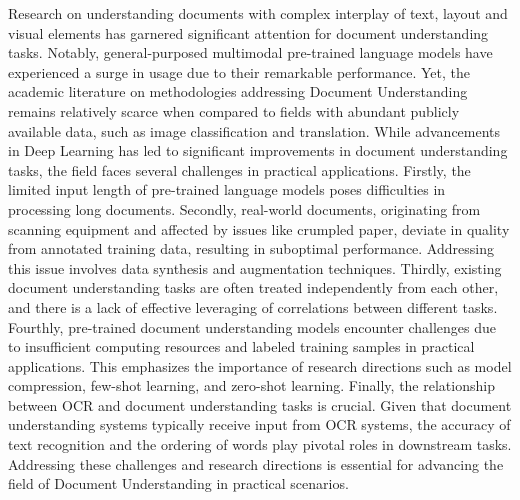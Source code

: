 Research on understanding documents with complex interplay of text, layout and visual elements has garnered significant attention for document understanding tasks. Notably, general-purposed multimodal pre-trained language models have  experienced a surge in usage due to their remarkable performance. Yet, the academic literature on methodologies addressing Document Understanding remains relatively scarce when compared to fields with abundant publicly available data, such as image classification and translation. While advancements in Deep Learning has led to significant improvements in document understanding tasks, the field faces several challenges in practical applications. Firstly, the limited input length of pre-trained language models poses difficulties in processing long documents. Secondly, real-world documents, originating from scanning equipment and affected by issues like crumpled paper, deviate in quality from annotated training data, resulting in suboptimal performance. Addressing this issue involves data synthesis and augmentation techniques. Thirdly, existing document understanding tasks are often treated independently from each other, and there is a lack of effective leveraging of correlations between different tasks. Fourthly, pre-trained document understanding models encounter challenges due to insufficient computing resources and labeled training samples in practical applications. This emphasizes the importance of research directions such as model compression, few-shot learning, and zero-shot learning. Finally, the relationship between \ac{OCR} and document understanding tasks is crucial. Given that document understanding systems typically receive input from \ac{OCR} systems, the accuracy of text recognition and the ordering of words play pivotal roles in downstream tasks. Addressing these challenges and research directions is essential for advancing the field of Document Understanding in practical scenarios.

\acresetall

